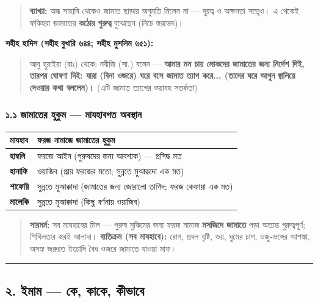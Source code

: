 \begin{quote}
\textbf{ব্যাখ্যা:} অন্ধ সাহাবি থেকেও জামাত ছাড়ার অনুমতি নিলেন না — দূরত্ব ও অক্ষমতা সত্ত্বেও। এ থেকেই ফকিহরা জামাতের \textbf{কঠোর গুরুত্ব} বুঝেছেন (নিচে স্তরভেদ)।
\end{quote}

\textbf{সহীহ হাদিস (সহীহ বুখারি ৬৪৪; সহীহ মুসলিম ৬৫১):}

\begin{quote}
আবু হুরাইরা (রাঃ) থেকে: নবীজি (সা.) বলেন — \textbf{আমার মন চায় লোকদের জামাতের জন্য নির্দেশ দিই, তারপর ঘোষণা দিই: যারা (বিনা ওজরে) ঘরে বসে জামাত ত্যাগ করে... (তাদের ঘরে আগুন জ্বালিয়ে দেওয়ার কথা বললেন)।} (এটি জামাত ত্যাগের ভয়াবহ সতর্কতা)
\end{quote}

\subsubsection*{১.১ জামাতের হুকুম — মাযহাবগত অবস্থান}

\begin{table}[h]\centering\small
\begin{tabular}{ll}
মাযহাব & ফরজ নামাজে জামাতের হুকুম \\
\hline
\textbf{হাম্বলি} & ফরজে আইন (পুরুষদের জন্য আবশ্যক) — প্রসিদ্ধ মত \\
\textbf{হানাফি} & ওয়াজিব (প্রায় ফরজের মতো; সুন্নতে মুআক্কাদা এক মত) \\
\textbf{শাফেয়ি} & সুন্নতে মুআক্কাদা (জামাতের জন্য জোরালো তাগিদ; ফরজ কেফায়া এক মত) \\
\textbf{মালেকি} & সুন্নতে মুআক্কাদা (কিছু বর্ণনায় ওয়াজিব) \\
\hline
\end{tabular}
\end{table}

\begin{quote}
\textbf{সারমর্ম:} সব মাযহাবের মিল — পুরুষ মুকিমের জন্য ফরজ নামাজ \textbf{মসজিদে জামাতে} পড়া অত্যন্ত গুরুত্বপূর্ণ; শিথিলতার স্তরই আলাদা। \textbf{ব্যতিক্রম (সব মাযহাবে):} রোগ, প্রবল বৃষ্টি, ভয়, ঘুমের চাপ, ওজু-ভঙ্গের আশঙ্কা, অসহ্য জরুরত ইত্যাদি বৈধ ওজরে জামাতে যাওয়া মাফ।
\end{quote}

\medskip\hrule\medskip

\subsection*{২. ইমাম — কে, কাকে, কীভাবে}

